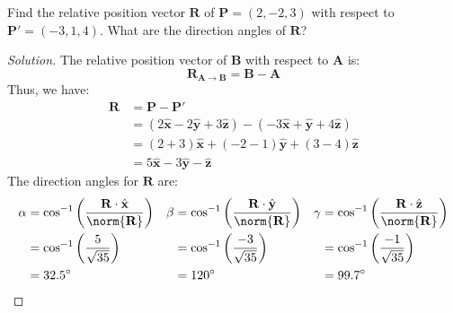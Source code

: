 \documentclass[crop=false,class=article,oneside]{standalone}
\begin{document}
        \begin{problem}[Wangsness 1-3]
            Find the relative position vector $\mathbf{R}$
            of $\mathbf{P}=(2,-2,3)$
            with respect to $\mathbf{P}'=(-3,1,4)$.
            What are the direction angles of $\mathbf{R}$?
        \end{problem}
        \begin{proof}[Solution]
            The relative position vector of $\mathbf{B}$
            with respect to $\mathbf{A}$ is:
            \begin{equation*}
                \mathbf{R}_{\mathbf{A}\rightarrow\mathbf{B}}
                =\mathbf{B}-\mathbf{A}
            \end{equation*}
            Thus, we have:
            \begin{align*}
                \mathbf{R}&=\mathbf{P}-\mathbf{P}'\\
                &=
                (2\hat{\mathbf{x}}
                -2\hat{\mathbf{y}}
                +3\hat{\mathbf{z}})
                -
                (-3\hat{\mathbf{x}}
                +\hat{\mathbf{y}}
                +4\hat{\mathbf{z}})\\
                &
                =(2+3)\hat{\mathbf{x}}
                +(-2-1)\hat{\mathbf{y}}
                +(3-4)\hat{\mathbf{z}}\\
                &
                =5\hat{\mathbf{x}}
                -3\hat{\mathbf{y}}
                -\hat{\mathbf{z}}
            \end{align*}
            The direction angles for $\mathbf{R}$ are:
            \begin{align*}
                \alpha
                &=\cos^{-1}\bigg(
                    \frac{\mathbf{R}\cdot\hat{\mathbf{x}}}
                    {\norm{\mathbf{R}}}
                \bigg)
                &
                \beta
                &=\cos^{-1}\bigg(
                    \frac{\mathbf{R}\cdot\hat{\mathbf{y}}}
                    {\norm{\mathbf{R}}}
                \bigg)
                &
                \gamma
                &=\cos^{-1}\bigg(
                    \frac{\mathbf{R}\cdot\hat{\mathbf{z}}}
                    {\norm{\mathbf{R}}}
                \bigg)\\
                &=\cos^{-1}\bigg(\frac{5}{\sqrt{35}}\bigg)
                &
                &=\cos^{-1}\bigg(\frac{-3}{\sqrt{35}}\bigg)
                &
                &=\cos^{-1}\bigg(\frac{-1}{\sqrt{35}}\bigg)\\
                &=32.5^{\circ}
                &
                &=120^{\circ}
                &
                &=99.7^{\circ}
            \end{align*}
        \end{proof}
\end{document}
